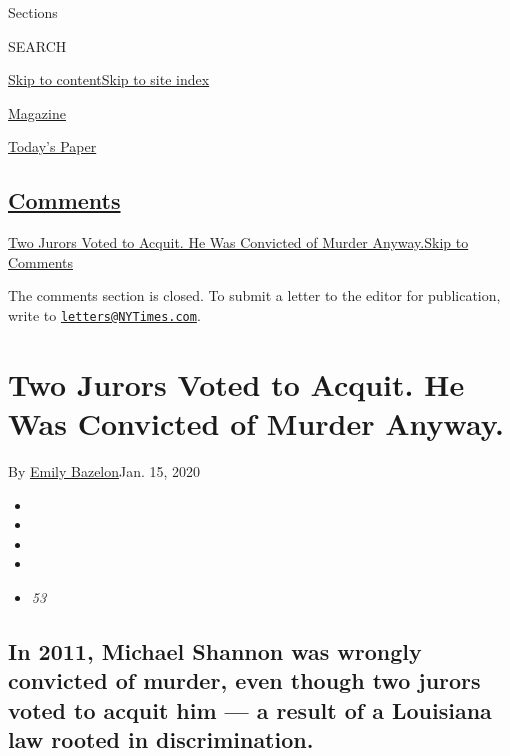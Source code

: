 Sections

SEARCH

\protect\hyperlink{site-content}{Skip to
content}\protect\hyperlink{site-index}{Skip to site index}

\href{https://www.nytimes3xbfgragh.onion/section/magazine}{Magazine}

\href{https://myaccount.nytimes3xbfgragh.onion/auth/login?response_type=cookie\&client_id=vi}{}

\href{https://www.nytimes3xbfgragh.onion/section/todayspaper}{Today's
Paper}

\hypertarget{comments}{%
\subsection{\texorpdfstring{\protect\hyperlink{commentsContainer}{Comments}}{Comments}}\label{comments}}

\href{}{Two Jurors Voted to Acquit. He Was Convicted of Murder
Anyway.}\href{}{Skip to Comments}

The comments section is closed. To submit a letter to the editor for
publication, write to
\href{mailto:letters@NYTimes.com}{\nolinkurl{letters@NYTimes.com}}.

\hypertarget{two-jurors-voted-to-acquit-he-was-convicted-of-murder-anyway}{%
\section{Two Jurors Voted to Acquit. He Was Convicted of Murder
Anyway.}\label{two-jurors-voted-to-acquit-he-was-convicted-of-murder-anyway}}

By \href{https://www.nytimes3xbfgragh.onion/by/emily-bazelon}{Emily
Bazelon}Jan. 15, 2020

\begin{itemize}
\item
\item
\item
\item
\item
  \emph{53}
\end{itemize}

\hypertarget{in-2011-michael-shannon-was-wrongly-convicted-of-murder-even-though-two-jurors-voted-to-acquit-him--a-result-of-a-louisiana-law-rooted-in-discrimination}{%
\subsection{In 2011, Michael Shannon was wrongly convicted of murder,
even though two jurors voted to acquit him --- a result of a Louisiana
law rooted in
discrimination.}\label{in-2011-michael-shannon-was-wrongly-convicted-of-murder-even-though-two-jurors-voted-to-acquit-him--a-result-of-a-louisiana-law-rooted-in-discrimination}}


